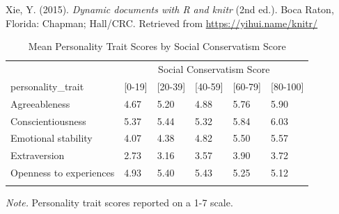 \documentclass[man]{apa6}
\begin{document}
\hypertarget{ref-R-knitr}{}
Xie, Y. (2015). \emph{Dynamic documents with R and knitr} (2nd ed.).
Boca Raton, Florida: Chapman; Hall/CRC. Retrieved from
\url{https://yihui.name/knitr/}

\begin{table}[tbp]
\begin{center}
\begin{threeparttable}
\caption{\label{tab:table1}Mean Personality Trait Scores by Social Conservatism Score}
\begin{tabular}{llllll}
\toprule
 & \multicolumn{5}{c}{Social Conservatism Score} \\
\cmidrule(r){2-6}
personality\_trait & \multicolumn{1}{c}{[0-19]} & \multicolumn{1}{c}{[20-39]} & \multicolumn{1}{c}{[40-59]} & \multicolumn{1}{c}{[60-79]} & \multicolumn{1}{c}{[80-100]}\\
\midrule
Agreeableness & 4.67 & 5.20 & 4.88 & 5.76 & 5.90\\
Conscientiousness & 5.37 & 5.44 & 5.32 & 5.84 & 6.03\\
Emotional stability & 4.07 & 4.38 & 4.82 & 5.50 & 5.57\\
Extraversion & 2.73 & 3.16 & 3.57 & 3.90 & 3.72\\
Openness to experiences & 4.93 & 5.40 & 5.43 & 5.25 & 5.12\\
\bottomrule
\addlinespace
\end{tabular}
\begin{tablenotes}[para]
\normalsize{\textit{Note.} Personality trait scores reported on a 1-7 scale.}
\end{tablenotes}
\end{threeparttable}
\end{center}
\end{table}
\end{document}
